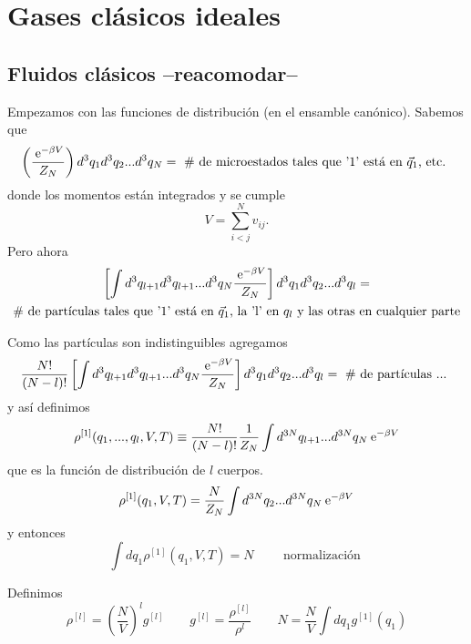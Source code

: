 \documentclass[10pt,oneside]{CBFT_book}
\begin{document}
\chapter{Gases clásicos ideales}


\section{Fluidos clásicos --reacomodar--}

Empezamos con las funciones de distribución (en el ensamble canónico). Sabemos que
\[
	\left( \frac{\:\mathrm{e}^{-\beta V}}{Z_N} \right)d^3q_1 d^3q_2 ... d^3q_N = 
	\text{ \# de microestados tales que '1' está en $\vec{q}_1$, etc. }
\]
donde los momentos están integrados y se cumple 
\[
	V = \sum_{i<j}^N v_{ij}.
\]
Pero ahora 
\begin{multline*}
	\left[ \int d^3q_{l+1} d^3q_{l+1} ... d^3q_{N} \frac{\:\mathrm{e}^{-\beta V}}{Z_N} \right] d^3q_1 d^3q_2 ... d^3q_l 
	=\\
	\text{ \# de partículas tales que '1' está en $\vec{q}_1$, la 'l' en $q_l$ y las otras en cualquier parte } 
\end{multline*}

Como las partículas son indistinguibles agregamos 
\[
	\frac{N!}{(N-l)!} \left[ \int d^3q_{l+1} d^3q_{l+1} ... d^3q_{N} \frac{\:\mathrm{e}^{-\beta V}}{Z_N} \right] 
	d^3q_1 d^3q_2 ... d^3q_l = \text{ \# de partículas ... } 
\]
y así definimos
\[
	\rho^{[1]}( q_1,...,q_l, V, T ) \equiv \frac{N!}{(N-l)!} \frac{1}{Z_N} \int d^{3N}q_{l+1} ...  d^{3N}q_N 
	\:\mathrm{e}^{-\beta V}
\]
que es la función de distribución de $l$ cuerpos.
\[
	\rho^{[1]}( q_1, V, T ) = \frac{N}{Z_N} \int d^{3N}q_2 ...  d^{3N}q_N \:\mathrm{e}^{-\beta V}
\]
y entonces
\[
	\int dq_1 \rho^{[1]}( q_1, V, T ) = N \qquad \text{ normalización }
\]

Definimos 
\[
	\rho^{[l]} = \left( \frac{N}{V} \right)^l g^{[l]} \qquad g^{[l]} = \frac{\rho^{[l]}}{\rho^l} 
	\qquad N = \frac{N}{V} \int dq_1 g^{[1]}( q_1 )
\]
\end{document}
